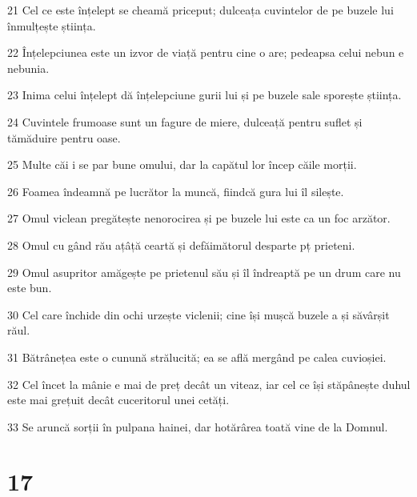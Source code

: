 \par 21 Cel ce este înțelept se cheamă priceput; dulceața cuvintelor de pe buzele lui înmulțește știința.
\par 22 Înțelepciunea este un izvor de viață pentru cine o are; pedeapsa celui nebun e nebunia.
\par 23 Inima celui înțelept dă înțelepciune gurii lui și pe buzele sale sporește știința.
\par 24 Cuvintele frumoase sunt un fagure de miere, dulceață pentru suflet și tămăduire pentru oase.
\par 25 Multe căi i se par bune omului, dar la capătul lor încep căile morții.
\par 26 Foamea îndeamnă pe lucrător la muncă, fiindcă gura lui îl silește.
\par 27 Omul viclean pregătește nenorocirea și pe buzele lui este ca un foc arzător.
\par 28 Omul cu gând rău ațâță ceartă și defăimătorul desparte pț prieteni.
\par 29 Omul asupritor amăgește pe prietenul său și îl îndreaptă pe un drum care nu este bun.
\par 30 Cel care închide din ochi urzește viclenii; cine își mușcă buzele a și săvârșit răul.
\par 31 Bătrânețea este o cunună strălucită; ea se află mergând pe calea cuvioșiei.
\par 32 Cel încet la mânie e mai de preț decât un viteaz, iar cel ce își stăpânește duhul este mai grețuit decât cuceritorul unei cetăți.
\par 33 Se aruncă sorții în pulpana hainei, dar hotărârea toată vine de la Domnul.

\chapter{17}

